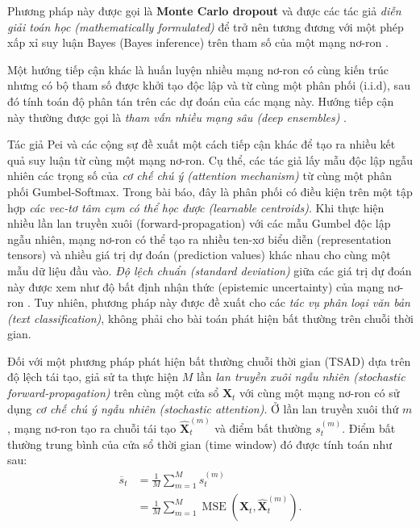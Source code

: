 Phương pháp này được gọi là \textbf{Monte Carlo dropout} và được các tác giả \textit{diễn giải toán học (mathematically formulated)} để trở nên tương đương với một phép xấp xỉ suy luận Bayes (Bayes inference) trên tham số của một mạng nơ-ron \cite{gal2016dropout}.

Một hướng tiếp cận khác là huấn luyện nhiều mạng nơ-ron có cùng kiến trúc nhưng có bộ tham số được khởi tạo độc lập và từ cùng một phân phối (i.i.d), sau đó tính toán độ phân tán trên các dự đoán của các mạng này. Hướng tiếp cận này thường được gọi là \textit{tham vấn nhiều mạng sâu (deep ensembles)} \cite{lakshminarayanan2017simple}.

Tác giả Pei và các cộng sự đề xuất một cách tiếp cận khác để tạo ra nhiều kết quả suy luận từ cùng một mạng nơ-ron. Cụ thể, các tác giả lấy mẫu độc lập ngẫu nhiên các trọng số của \textit{cơ chế chú ý (attention mechanism)} \cite{bahdanau2014attn} từ cùng một phân phối Gumbel-Softmax. Trong bài báo, đây là phân phối có điều kiện trên một tập hợp \textit{các vec-tơ tâm cụm có thể học được (learnable centroids)}. Khi thực hiện nhiều lần lan truyền xuôi (forward-propagation) với các mẫu Gumbel độc lập ngẫu nhiên, mạng nơ-ron có thể tạo ra nhiều ten-xơ biểu diễn (representation tensors) và nhiều giá trị dự đoán (prediction values) khác nhau cho cùng một mẫu dữ liệu đầu vào. \textit{Độ lệch chuẩn (standard deviation)} giữa các giá trị dự đoán này được xem như độ bất định nhận thức (epistemic uncertainty) của mạng nơ-ron \cite{pei2022transformer}. Tuy nhiên, phương pháp này được đề xuất cho các \textit{tác vụ phân loại văn bản (text classification)}, không phải cho bài toán phát hiện bất thường trên chuỗi thời gian.

Đối với một phương pháp phát hiện bất thường chuỗi thời gian (TSAD) dựa trên độ lệch tái tạo, giả sử ta thực hiện \(M\) lần \textit{lan truyền xuôi ngẫu nhiên (stochastic forward-propagation)} trên cùng một cửa sổ \(\mathbf{X}_t\) với cùng một mạng nơ-ron có sử dụng \textit{cơ chế chú ý ngẫu nhiên (stochastic attention)}. Ở lần lan truyền xuôi thứ \(m\), mạng nơ-ron tạo ra chuỗi tái tạo
\(\widehat{\mathbf{X}}_t^{(m)}\) và điểm bất thường
\(s_t^{(m)}\). Điểm bất thường trung bình của cửa sổ thời gian (time window) đó được tính toán như sau:
\begin{equation}
\begin{aligned}
\overline{s}_t
&=
\frac{1}{M}
\sum_{m=1}^{M}
s_t^{(m)}
\\[4pt]
&=
\frac{1}{M}
\sum_{m=1}^{M}
\operatorname{MSE}
\left(
\mathbf{X}_t,
\widehat{\mathbf{X}}_t^{(m)}
\right).
\end{aligned}
\label{eq:mean-anomaly-score}
\end{equation}

